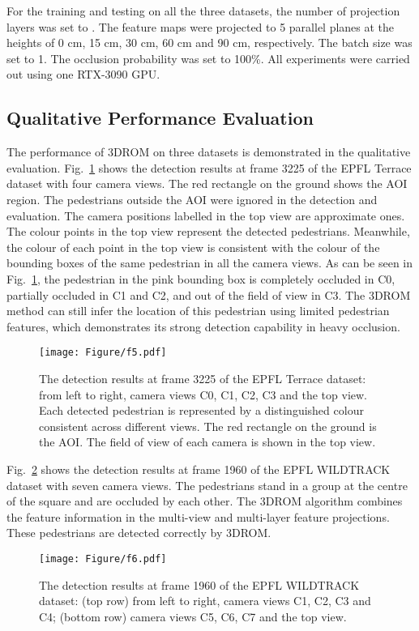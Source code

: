 \documentclass[runningheads]{llncs}
\begin{document}
	
	For the training and testing on all the three datasets, the number of projection layers was set to . The feature maps were projected to 5 parallel planes at the heights of 0 cm, 15 cm, 30 cm, 60 cm and 90 cm, respectively. The batch size was set to 1. The occlusion probability  was set to 100\%. All experiments were carried out using one RTX-3090 GPU.


	
	
	\subsection{Qualitative Performance Evaluation}
	The performance of 3DROM on three datasets is demonstrated in the qualitative evaluation. Fig.~\ref{f5} shows the detection results at frame 3225 of the EPFL Terrace dataset with four camera views. The red rectangle on the ground shows the AOI region. The pedestrians outside the AOI were ignored in the detection and evaluation. The camera positions labelled in the top view are approximate ones. The colour points in the top view represent the detected pedestrians. Meanwhile, the colour of each point in the top view is consistent with the colour of the bounding boxes of the same pedestrian in all the camera views. As can be seen in Fig.~\ref{f5}, the pedestrian in the pink bounding box is completely occluded in C0, partially occluded in C1 and C2, and out of the field of view in C3. The 3DROM method can still infer the location of this pedestrian using limited pedestrian features, which demonstrates its strong detection capability in heavy occlusion.
	\begin{figure}
		\centering
		\texttt{[image: Figure/f5.pdf]}
\caption{The detection results at frame 3225 of the EPFL Terrace dataset: from left to right, camera views C0, C1, C2, C3 and the top view. Each detected pedestrian is represented by a distinguished colour consistent across different views. The red rectangle on the ground is the AOI. The field of view of each camera is shown in the top view.
		}
		\label{f5}
	\end{figure}
	
	
	Fig.~\ref{f6} shows the detection results at frame 1960 of the EPFL WILDTRACK dataset with seven camera views. The pedestrians stand in a group at the centre of the square and are occluded by each other. The 3DROM algorithm combines the feature information in the multi-view and multi-layer feature projections. These pedestrians are detected correctly by 3DROM.
	\begin{figure}[t]
		\centering
		\texttt{[image: Figure/f6.pdf]}
		\caption{The detection results at frame 1960 of the EPFL WILDTRACK dataset: (top row) from left to right, camera views C1, C2, C3 and C4; (bottom row) camera views C5, C6, C7 and the top view.}
		\label{f6}
	\end{figure}
	
\end{document}
